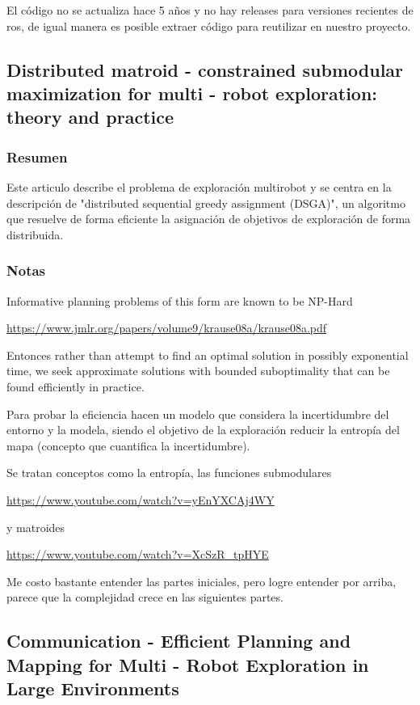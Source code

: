 El código no se actualiza hace 5 años y no hay releases para versiones recientes de ros, de igual manera es posible extraer código para reutilizar en nuestro proyecto.

\subsection{Distributed matroid - constrained submodular maximization for multi - robot exploration: theory and practice}
\subsubsection{Resumen}
Este articulo describe el problema de exploración multirobot y se centra en la descripción de "distributed sequential greedy assignment (DSGA)", un algoritmo que resuelve de forma eficiente la asignación de objetivos de exploración de forma distribuida.

\subsubsection{Notas}
Informative planning problems of this form are known to be NP-Hard 

\url{https://www.jmlr.org/papers/volume9/krause08a/krause08a.pdf}

Entonces rather than attempt to find an optimal solution in possibly exponential time, we seek approximate solutions with bounded suboptimality that can be found efficiently in practice.

Para probar la eficiencia hacen un modelo que considera la incertidumbre del entorno y la modela, siendo el objetivo de la exploración reducir la entropía del mapa (concepto que cuantifica la incertidumbre).

Se tratan conceptos como la entropía, las funciones submodulares

\url{https://www.youtube.com/watch?v=yEnYXCAj4WY}

y matroides

\url{https://www.youtube.com/watch?v=XcSzR_tpHYE}

Me costo bastante entender las partes iniciales, pero logre entender por arriba, parece que la complejidad crece en las siguientes partes.

\subsection{Communication - Efficient Planning and Mapping for Multi - Robot Exploration in Large Environments}
